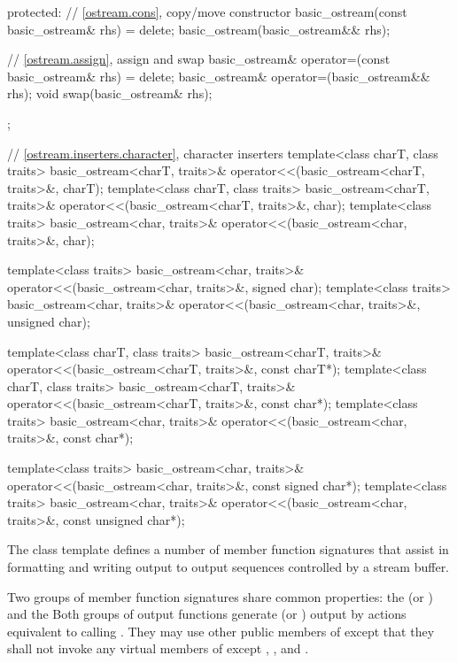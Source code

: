 \begin{codeblock}
{{  protected:
    // \ref{ostream.cons}, copy/move constructor
    basic_ostream(const basic_ostream& rhs) = delete;
    basic_ostream(basic_ostream&& rhs);

    // \ref{ostream.assign}, assign and swap
    basic_ostream& operator=(const basic_ostream& rhs) = delete;
    basic_ostream& operator=(basic_ostream&& rhs);
    void swap(basic_ostream& rhs);
  };

  // \ref{ostream.inserters.character}, character inserters
  template<class charT, class traits>
    basic_ostream<charT, traits>& operator<<(basic_ostream<charT, traits>&, charT);
  template<class charT, class traits>
    basic_ostream<charT, traits>& operator<<(basic_ostream<charT, traits>&, char);
  template<class traits>
    basic_ostream<char, traits>& operator<<(basic_ostream<char, traits>&, char);

  template<class traits>
    basic_ostream<char, traits>& operator<<(basic_ostream<char, traits>&, signed char);
  template<class traits>
    basic_ostream<char, traits>& operator<<(basic_ostream<char, traits>&, unsigned char);

  template<class charT, class traits>
    basic_ostream<charT, traits>& operator<<(basic_ostream<charT, traits>&, const charT*);
  template<class charT, class traits>
    basic_ostream<charT, traits>& operator<<(basic_ostream<charT, traits>&, const char*);
  template<class traits>
    basic_ostream<char, traits>& operator<<(basic_ostream<char, traits>&, const char*);

  template<class traits>
    basic_ostream<char, traits>& operator<<(basic_ostream<char, traits>&, const signed char*);
  template<class traits>
    basic_ostream<char, traits>& operator<<(basic_ostream<char, traits>&, const unsigned char*);
}
\end{codeblock}

\pnum
The class template
defines a number of member function
signatures that assist in formatting and writing output to output sequences
controlled by a stream buffer.

\pnum
Two groups of member function signatures share common properties:
the
(or
)
and the
Both groups of output functions generate (or
)
output
by actions equivalent to calling
.
They may use other public members of
except that they shall not invoke any virtual members of
except
,
,
and
.

